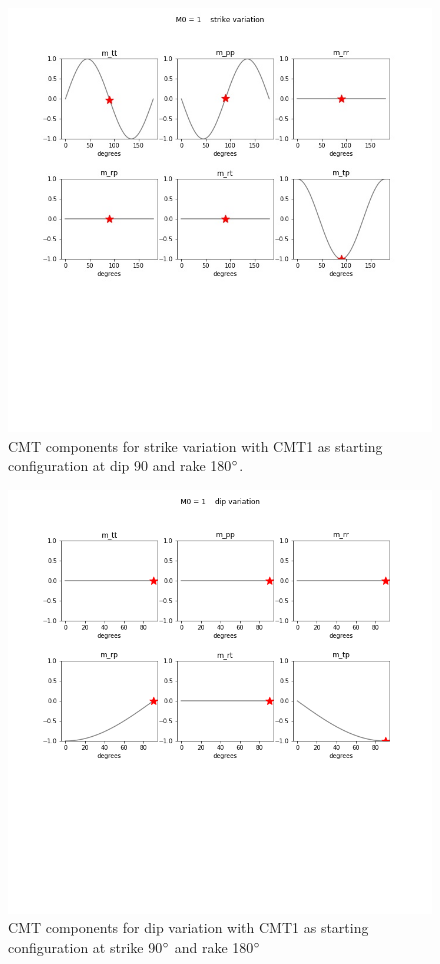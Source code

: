 \documentclass[../Text/00main.tex]{subfiles}
\begin{document}
\FloatBarrier
\begin{figure}[htb!]
    \centering
    \includegraphics[width=1.0\textwidth, trim= 0cm 10cm 0cm 0cm,clip]{images_methods/strikevar.jpg}
    \caption{CMT components for strike variation with CMT1 as starting configuration at dip 90 and rake 180$\degree$.}
    \label{figapp: strikevar}
\end{figure}

\begin{figure}[htb!]
    \centering
    \includegraphics[width=1.0\textwidth, trim= 0cm 10cm 0cm 0cm,clip]{images_methods/dipvar.png}
    \caption{CMT components for dip variation with CMT1 as starting configuration at strike 90$\degree$ and rake 180$\degree$}
    \label{figapp: dipvar}
\end{figure}
\end{document}
